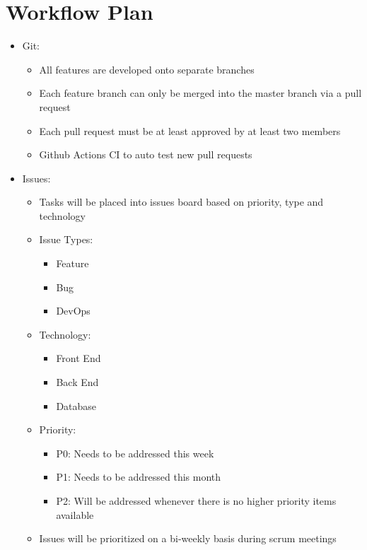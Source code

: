 \documentclass{article}
\begin{document}
\section{Workflow Plan}

\begin{itemize}
    \item Git: \begin{itemize}
        \item All features are developed onto separate branches
        \item Each feature branch can only be merged into the master branch via a pull request
        \item Each pull request must be at least approved by at least two members
        
        \item Github Actions CI to auto test new pull requests
    \end{itemize}
	\item Issues: \begin{itemize}
	    \item Tasks will be placed into issues board based on priority, type and technology
        \item Issue Types:
            \begin{itemize}
                \item Feature
                \item Bug
                \item DevOps
            \end{itemize}
        \item Technology: 
        \begin{itemize}
                \item Front End
                \item Back End
                \item Database
            \end{itemize}
        \item Priority:
        \begin{itemize}
            \item P0: Needs to be addressed this week
            \item P1: Needs to be addressed this month
            \item P2: Will be addressed whenever there is no higher priority items available
        \end{itemize}
        \item Issues will be prioritized on a bi-weekly basis during scrum meetings
	\end{itemize}
\end{itemize}
\end{document}
